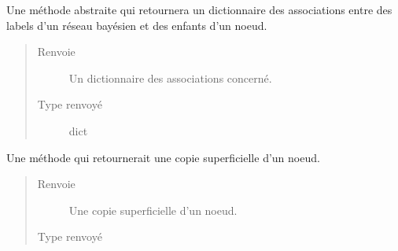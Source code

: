 \documentclass[letterpaper,10pt,french]{sphinxmanual}
\begin{document}
\begin{fulllineitems}
\begin{fulllineitems}
\end{fulllineitems}


\begin{fulllineitems}
\label{\detokenize{index:StrategyTree.NodeST.bn_labels_children_association}}
Une méthode abstraite qui retournera un dictionnaire des associations entre des labels d’un réseau
bayésien et des enfants d’un noeud.
\begin{quote}\begin{description}
\item[{Renvoie}] \leavevmode
{} \textendash{} Un dictionnaire des associations concerné.

\item[{Type renvoyé}] \leavevmode
dict

\end{description}\end{quote}

\end{fulllineitems}


\begin{fulllineitems}
\label{\detokenize{index:StrategyTree.NodeST.copy}}
Une méthode qui retournerait une copie superficielle d’un noeud.
\begin{quote}\begin{description}
\item[{Renvoie}] \leavevmode
{} \textendash{} Une copie superficielle d’un noeud.

\item[{Type renvoyé}] \leavevmode
{\hyperref[\detokenize{index:StrategyTree.NodeST}]{}}

\end{description}\end{quote}

\end{fulllineitems}



\end{fulllineitems}
\end{document}
